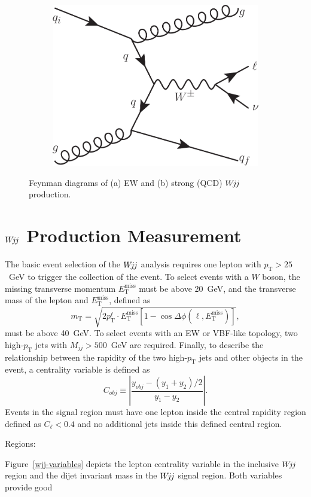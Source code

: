 \documentclass{PoS}
\def\wjj{\ensuremath{W\kern -0.2em j\kern -0.1emj}\xspace}
\def\w{\ensuremath{W}\xspace}
\def\mjj{\ensuremath{M_{jj}}\xspace}
\def\etmiss{\ensuremath{E_\mathrm{T}^\mathrm{miss}}\xspace}
\def\pt{\ensuremath{p_\mathrm{T}}\xspace}
\def\ptl{\ensuremath{p^\ell_\mathrm{T}}\xspace}
\begin{document}
\begin{figure}[t!]
\begin{subfigure}[t]{0.26\textwidth}
    \includegraphics[width=.99\textwidth]{STDM-2014-11/fig_02b.pdf}
    \caption{}
  \end{subfigure}
  \caption{Feynman diagrams of (a) EW and (b) strong (QCD) \wjj production.}
\end{figure}

\section{\wjj Production Measurement}

The basic event selection of the \wjj analysis requires one lepton with ${\pt>25}$~GeV to trigger the
collection of the event. To select events with a \w boson, the missing transverse momentum \etmiss
must be above 20~GeV, and the transverse mass of the lepton and \etmiss, defined as
\[
m_\mathrm{T}=\sqrt{ 2\ptl \cdot \etmiss \left[ 1-\cos\Delta\phi(\ell,\etmiss) \right]},
\]
must be above 40~GeV. To select events with an EW or VBF-like topology, two high-\pt jets with
${\mjj>500}$~GeV are required. Finally, to describe the relationship between the rapidity of the two
high-\pt jets and other objects in the event, a centrality variable is defined as
\[
C_{obj} \equiv \left| \frac{y_{obj} - (y_1 + y_2)/2}{y_1 - y_2}  \right|.
\]
%
Events in the signal region must have one lepton inside the central rapidity region defined as
${C_\ell<0.4}$ and no additional jets inside this defined central region.
%

Regions:

Figure~\ref{wjj-variables} depicts the lepton centrality variable in the inclusive \wjj region and
the dijet invariant mass in the \wjj signal region. Both variables provide good
\end{document}
